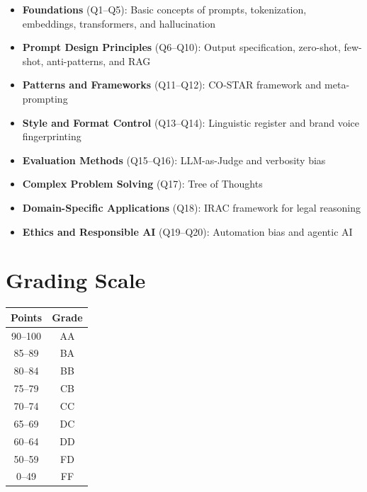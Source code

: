 \documentclass[11pt]{article}
\begin{document}
\begin{itemize}
    \item \textbf{Foundations} (Q1--Q5): Basic concepts of prompts, tokenization, embeddings, transformers, and hallucination
    \item \textbf{Prompt Design Principles} (Q6--Q10): Output specification, zero-shot, few-shot, anti-patterns, and RAG
    \item \textbf{Patterns and Frameworks} (Q11--Q12): CO-STAR framework and meta-prompting
    \item \textbf{Style and Format Control} (Q13--Q14): Linguistic register and brand voice fingerprinting
    \item \textbf{Evaluation Methods} (Q15--Q16): LLM-as-Judge and verbosity bias
    \item \textbf{Complex Problem Solving} (Q17): Tree of Thoughts
    \item \textbf{Domain-Specific Applications} (Q18): IRAC framework for legal reasoning
    \item \textbf{Ethics and Responsible AI} (Q19--Q20): Automation bias and agentic AI
\end{itemize}

\vspace{1cm}

\section*{Grading Scale}

\begin{center}
\begin{tabular}{|c|c|}
\hline
\textbf{Points} & \textbf{Grade} \\
\hline
90--100 & AA \\
85--89 & BA \\
80--84 & BB \\
75--79 & CB \\
70--74 & CC \\
65--69 & DC \\
60--64 & DD \\
50--59 & FD \\
0--49 & FF \\
\hline
\end{tabular}
\end{center}
\end{document}
